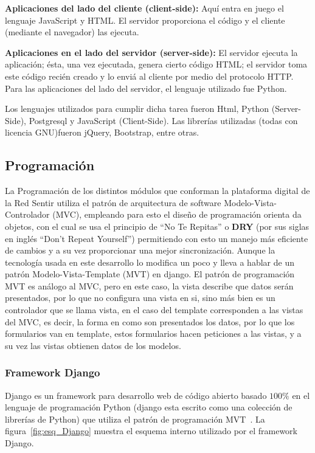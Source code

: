 \documentclass[journal,transmag]{IEEEtran}
\begin{document}
\textbf{Aplicaciones del lado del cliente (client-side):} Aquí entra en juego el lenguaje JavaScript y HTML. El servidor proporciona el código y el cliente (mediante el navegador) las ejecuta. 

\textbf{Aplicaciones en el lado del servidor (server-side):} El servidor ejecuta la aplicación; ésta, una vez ejecutada, genera cierto código HTML; el servidor toma este código recién creado y lo enviá al cliente por medio del protocolo HTTP. Para las aplicaciones del lado del servidor, el lenguaje utilizado fue  Python.

Los lenguajes utilizados para cumplir dicha tarea fueron Html, Python (Server-Side), Postgresql y JavaScript (Client-Side). Las librerías utilizadas (todas con licencia GNU)fueron jQuery, Bootstrap, entre otras.

\subsection{Programación}
La Programación de los distintos módulos que conforman la plataforma digital de la Red Sentir utiliza el patrón de arquitectura de software Modelo-Vista-Controlador (MVC), empleando para esto el diseño de programación orienta da objetos, con el cual se usa el principio de ``No Te Repitas'' o \textbf{DRY} (por sus siglas en inglés ``Don't Repeat Yourself'') permitiendo con esto un manejo más eficiente de cambios y a su vez proporcionar una mejor sincronización. Aunque la tecnología usada en este desarrollo lo modifica un poco y lleva a hablar de un patrón Modelo-Vista-Template (MVT) en django. El patrón de programación MVT es análogo al MVC, pero en este caso, la vista describe que datos serán presentados, por lo que no configura una vista en si, sino más bien es un controlador que se llama vista, en el caso del template corresponden a las vistas del MVC, es decir, la forma en como son presentados los datos, por lo que los formularios van en template, estos formularios hacen peticiones a las vistas, y a su vez las vistas obtienen datos de los modelos.

\subsubsection{Framework Django}
Django es un framework para desarrollo web de código abierto basado $100\%$ en el lenguaje de programación Python (django esta escrito como una colección de librerías de Python) que utiliza el patrón de programación MVT~\cite{Hol2009, DjangoM}. La figura~\ref{fig:esq_Django} muestra el esquema interno utilizado por el framework Django.
\end{document}
